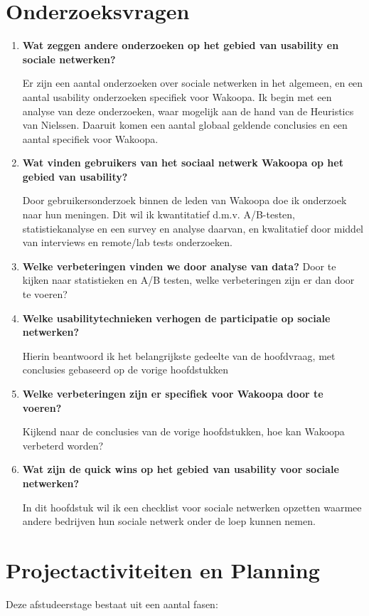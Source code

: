 \documentclass[a4paper, 10pt, pdftex]{article}
\begin{document}
\section{Onderzoeksvragen}
\begin{enumerate}
\item
 \textbf{Wat zeggen andere onderzoeken op het gebied van usability en sociale netwerken?}

Er zijn een aantal onderzoeken over sociale netwerken in het algemeen, en een aantal usability onderzoeken specifiek voor Wakoopa. Ik begin met een analyse van deze onderzoeken, waar mogelijk aan de hand van de Heuristics van Nielssen. Daaruit komen een aantal globaal geldende conclusies en een aantal specifiek voor Wakoopa.

\item
\textbf{Wat vinden gebruikers van het sociaal netwerk Wakoopa op het gebied van usability?}

Door gebruikersonderzoek binnen de leden van Wakoopa doe ik onderzoek naar hun meningen. Dit wil ik kwantitatief d.m.v. A/B-testen, statistiekanalyse en een survey en analyse daarvan, en kwalitatief door middel van interviews en remote/lab tests onderzoeken.

\item
\textbf{Welke verbeteringen vinden we door analyse van data?}
Door te kijken naar statistieken en A/B testen, welke verbeteringen zijn er dan door te voeren?

\item
\textbf{Welke usabilitytechnieken verhogen de participatie op sociale netwerken?}

Hierin beantwoord ik het belangrijkste gedeelte van de hoofdvraag, met conclusies gebaseerd op de vorige hoofdstukken

\item
\textbf{Welke verbeteringen zijn er specifiek voor Wakoopa door te voeren?}

Kijkend naar de conclusies van de vorige hoofdstukken, hoe kan Wakoopa verbeterd worden?

\item
\textbf{Wat zijn de quick wins op het gebied van usability voor sociale netwerken?}

In dit hoofdstuk wil ik een checklist voor sociale netwerken opzetten waarmee andere bedrijven hun sociale netwerk onder de loep kunnen nemen.
\end{enumerate}

\section{Projectactiviteiten en Planning}
Deze afstudeerstage bestaat uit een aantal fasen:
\end{document}
